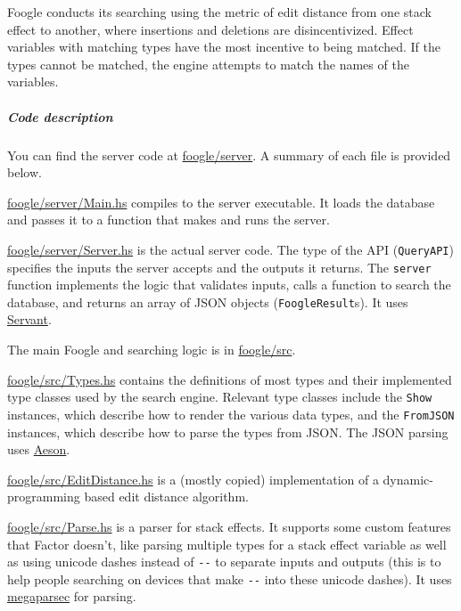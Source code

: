 \documentclass[
]{article}
\begin{document}
Foogle conducts its searching using the metric of edit distance from one
stack effect to another, where insertions and deletions are
disincentivized. Effect variables with matching types have the most
incentive to being matched. If the types cannot be matched, the engine
attempts to match the names of the variables.

\hypertarget{code-description}{%
\subparagraph{Code description}\label{code-description}}

You can find the server code at
\href{https://github.com/factor-hmc/foogle/tree/master/server}{foogle/server}.
A summary of each file is provided below.

\href{https://github.com/factor-hmc/foogle/blob/master/server/Main.hs}{foogle/server/Main.hs}
compiles to the server executable. It loads the database and passes it
to a function that makes and runs the server.

\href{https://github.com/factor-hmc/foogle/blob/master/server/Server.hs}{foogle/server/Server.hs}
is the actual server code. The type of the API (\texttt{QueryAPI})
specifies the inputs the server accepts and the outputs it returns. The
\texttt{server} function implements the logic that validates inputs,
calls a function to search the database, and returns an array of JSON
objects (\texttt{FoogleResult}s). It uses
\href{https://www.servant.dev/}{Servant}.

The main Foogle and searching logic is in
\href{https://github.com/factor-hmc/foogle/tree/master/src}{foogle/src}.

\href{https://github.com/factor-hmc/foogle/blob/master/src/Types.hs}{foogle/src/Types.hs}
contains the definitions of most types and their implemented type
classes used by the search engine. Relevant type classes include the
\texttt{Show} instances, which describe how to render the various data
types, and the \texttt{FromJSON} instances, which describe how to parse
the types from JSON. The JSON parsing uses
\href{https://hackage.haskell.org/package/aeson}{Aeson}.

\href{https://github.com/factor-hmc/foogle/blob/master/src/EditDistance.hs}{foogle/src/EditDistance.hs}
is a (mostly copied) implementation of a dynamic-programming based edit
distance algorithm.

\href{https://github.com/factor-hmc/foogle/blob/master/src/Parse.hs}{foogle/src/Parse.hs}
is a parser for stack effects. It supports some custom features that
Factor doesn't, like parsing multiple types for a stack effect variable
as well as using unicode dashes instead of \texttt{-\/-} to separate
inputs and outputs (this is to help people searching on devices that
make \texttt{-\/-} into these unicode dashes). It uses
\href{https://hackage.haskell.org/package/megaparsec}{megaparsec} for
parsing.
\end{document}
